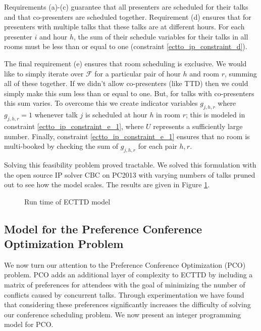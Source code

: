 \documentclass{svjour3}                     %
\begin{document}
Requirements (a)-(c) guarantee that all presenters are scheduled for their talks and that co-presenters are scheduled together. 
Requirement (d) ensures that for presenters with multiple talks that these talks are at different hours. 
For each presenter $i$ and hour $h$, the sum of their schedule variables for their talks in all rooms must be less than or equal to one (constraint \ref{ectto_ip_constraint_d}).

The final requirement (e) ensures that room scheduling is exclusive. 
We would like to simply iterate over $\mathcal F$ for a particular pair of hour $h$ and room $r$, summing all of these together. 
If we didn't allow co-presenters (like TTD) then we could simply make this sum less than or equal to one. But, for talks with co-presenters this sum varies. 
To overcome this we create indicator variables $g_{j,h,r}$ where $g_{j,h,r}=1$ whenever talk $j$ is scheduled at hour $h$ in room $r$; 
this is modeled in constraint \ref{ectto_ip_constraint_e_1}, where $U$ represents a sufficiently large number.
Finally, constraint \ref{ectto_ip_constraint_e_1} ensures that no room is multi-booked by checking the sum of $g_{j,h,r}$ for each pair $h,r$.

Solving this feasibility problem proved tractable. 
We solved this formulation with the open source IP solver CBC on PC2013 with varying numbers of talks pruned out to see how the model scales. 
The results are given in Figure \ref{ectto_run_time}.
\begin{figure}[h!]
	\caption{Run time of ECTTD model}
	\centering
	
	\label{ectto_run_time}
\end{figure}

\subsection{Model for the Preference Conference Optimization Problem}
We now turn our attention to the Preference Conference Optimization (PCO) problem. 
PCO adds an additional layer of complexity to ECTTD by including a matrix of preferences for attendees with the goal of minimizing the number of conflicts caused by concurrent talks. 
Through experimentation we have found that considering these preferences significantly increases the difficulty of solving our conference scheduling problem. 
We now present an integer programming model for PCO.
\end{document}
